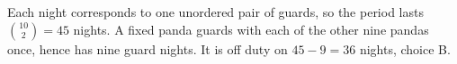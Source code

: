 Each night corresponds to one unordered pair of guards, so the period lasts $\binom{10}{2}=45$ nights. A fixed panda guards with each of the other nine pandas once, hence has nine guard nights. It is off duty on $45-9=\boxed{36}$ nights, choice B.
